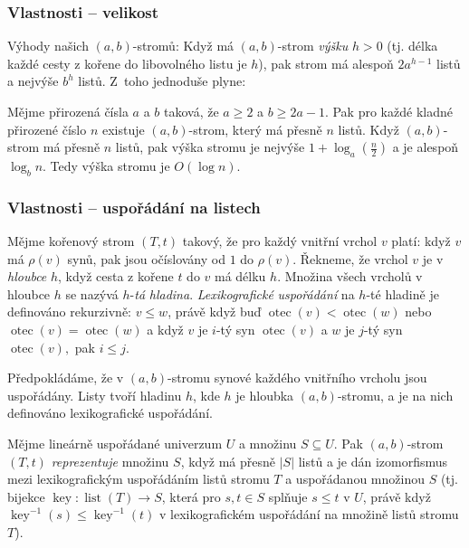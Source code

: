 \documentclass[a4paper,12pt]{article}
\DeclareMathOperator*{\otec}{otec}
\DeclareMathOperator*{\listop}{list}
\DeclareMathOperator*{\key}{key}
\begin{document}
\subsubsection{Vlastnosti -- velikost}
Výhody našich $(a,b)$-stromů:\newline 
Když má $(a,b)$-strom \emph{výšku} $h>0$ (tj. délka každé 
cesty z kořene do libovolného listu je $h$), pak 
strom má alespoň $2a^{h-1}$ listů a nejvýše $b^
h$ 
listů. Z~toho jednoduše plyne:

\begin{tvrzeni}Mějme přirozená čísla $a$ a $
b$ taková, 
že $a\ge 2$ a $b\ge 2a-1$. Pak pro každé kladné přirozené 
číslo $n$ existuje $(a,b)$-strom, který má přesně $
n$ 
listů. Když $(a,b)$-strom má přesně $n$ 
listů, pak výška stromu je nejvýše $1+\log_a(\frac 
n2)$ a 
je alespoň $\log_bn$. Tedy výška stromu je $O(\log n)$.
\end{tvrzeni}

\subsubsection{Vlastnosti -- uspořádání na listech}

Mějme kořenový strom $(T,t)$ takový, že pro každý 
vnitřní vrchol $v$ platí:\newline 
když $v$ má $\rho (v)$ synů, pak jsou očíslovány od $
1$ do 
$\rho (v)$. Řekne\-me, že vrchol $v$ je v \emph{hloubce} $h$, když 
cesta z kořene $t$ do $v$ má délku $h$. Množina všech 
vrcholů v hloubce $h$ se nazývá $h$-\emph{tá} 
\emph{hladina}. \emph{Lexikografické} \emph{uspořádání} 
na $h$-té hladině je definováno rekurzivně:\newline 
\newline 
$v\le w$, právě když buď $\otec(v)<\otec(w)$ nebo 
$\otec(v)=\otec(w)$ a když $v$ je $i$-tý syn $\otec(v)$ a $w$ je 
$j$-tý syn $\otec(v),$ pak $i\le j$.  

Předpokládáme, že v $(a,b)$-stromu  
synové každého vnitřního vrcholu jsou uspořádány. Listy 
tvoří hladinu $h$, kde $h$ je hloub\-ka $(a,b)$-stromu, a je na nich 
definováno lexikografické uspořá\-dá\-ní.

Mějme lineárně uspořádané univerzum $U$ a 
množinu $S\subseteq U$.  Pak $(a,b)$-strom $(T,t)$ 
\emph{reprezentuje} množinu $S$, když má přesně $|S
|$ 
listů a je dán izomorfismus mezi lexikografickým uspořá\-dá\-ním 
listů stromu $T$ a uspořádanou množinou $S$ 
(tj.  bijekce $\key:\listop(T)\to S$, která pro $s,t\in S$ 
splňuje $s\le t$ v $U$, právě když $\key^{-1}(s)\le\key^{
-1}(t)$ v 
lexikografickém uspořádání na množině listů 
stromu $T$).  
\end{document}
